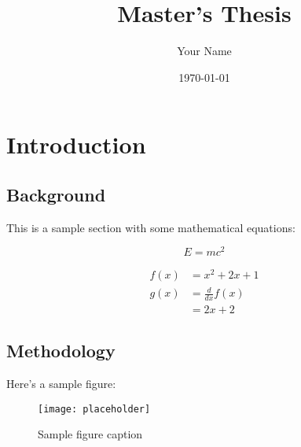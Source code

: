 \documentclass[12pt]{report}
\title{Master's Thesis}
\author{Your Name}
\date{\today}
\begin{document}
\maketitle
\tableofcontents

\chapter{Introduction}
\section{Background}
This is a sample section with some mathematical equations:

\begin{equation}
    E = mc^2
\end{equation}

\begin{align}
    f(x) &= x^2 + 2x + 1 \\
    g(x) &= \frac{d}{dx}f(x) \\
    &= 2x + 2
\end{align}

\section{Methodology}
Here's a sample figure:

\begin{figure}[h]
    \centering
    \texttt{[image: placeholder]}
    \caption{Sample figure caption}
    \label{fig:sample}
\end{figure}
\end{document}
